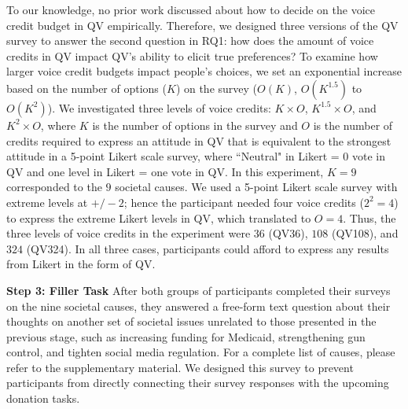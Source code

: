 To our knowledge, no prior work discussed about how to decide on the voice credit budget in QV empirically. Therefore, we designed three versions of the QV survey to answer the second question in RQ1: how does the amount of voice credits in QV impact QV's ability to elicit true preferences? To examine how larger voice credit budgets impact people's choices, we set an exponential increase based on the number of options ($K$) on the survey ($O(K)$, $O(K^{1.5})$ to $O(K^2)$). We investigated three levels of voice credits: $K \times O$, $K^{1.5} \times O$, and $K^2 \times O$, where $K$ is the number of options in the survey and $O$ is the number of credits required to express an attitude in QV that is equivalent to the strongest attitude in a 5-point Likert scale survey, where ``Neutral" in Likert = 0 vote in QV and one level in Likert = one vote in QV. In this experiment, $K=9$ corresponded to the $9$ societal causes. We used a 5-point Likert scale survey with extreme levels at $+/-2$; hence the participant needed four voice credits ($2^2=4$) to express the extreme Likert levels in QV, which translated to $O=4$. Thus, the three levels of voice credits in the experiment were $36$ (QV36), $108$ (QV108), and $324$ (QV324). In all three cases, participants could afford to express any results from Likert in the form of QV. 



\textbf{Step 3: Filler Task} After both groups of participants completed their surveys on the nine societal causes,  they answered a free-form text question about their thoughts on another set of societal issues unrelated to those presented in the previous stage, such as increasing funding for Medicaid, strengthening gun control, and tighten social media regulation. For a complete list of causes, please refer to the supplementary material.  We designed this survey to prevent participants from directly connecting their survey responses with the upcoming donation tasks.


